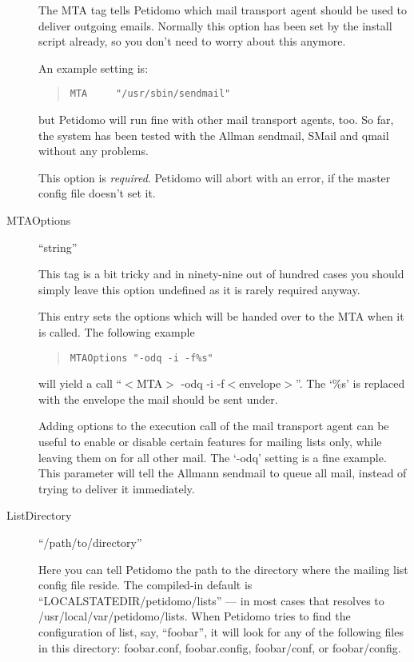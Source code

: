 \documentclass[a4paper,11pt]{scrreprt}
\newcommand{\file}[1]{{\sf #1}}
\begin{document}
\begin{description}
The MTA tag tells Petidomo which mail transport agent should be used
to deliver outgoing emails. Normally this option has been set by the
install script already, so you don't need to worry about this anymore.

An example setting is:
\begin{quote}
\begin{verbatim}
MTA     "/usr/sbin/sendmail"
\end{verbatim}
\end{quote}
but Petidomo will run fine with other mail transport agents, too. So
far, the system has been tested with the Allman sendmail, SMail and
qmail without any problems.

This option is \emph{required}. Petidomo will abort with an error,
if the master config file doesn't set it.


\item[MTAOptions] \hfill ``string''

This tag is a bit tricky and in ninety-nine out of hundred cases you
should simply leave this option undefined as it is rarely required
anyway.

This entry sets the options which will be handed over to the MTA
when it is called. The following example
\begin{quote}
\begin{verbatim}
MTAOptions "-odq -i -f%s"
\end{verbatim}
\end{quote}
will yield a call ``$<$MTA$>$ -odq -i -f$<$envelope$>$''. The `\%s' is
replaced with the envelope the mail should be sent under.

Adding options to the execution call of the mail transport agent can
be useful to enable or disable certain features for mailing lists
only, while leaving them on for all other mail. The `-odq' setting is
a fine example. This parameter will tell the Allmann sendmail to queue
all mail, instead of trying to deliver it immediately.


\item[ListDirectory] \hfill ``/path/to/directory''

Here you can tell Petidomo the path to the directory where the mailing
list config file reside. The compiled-in default is
``LOCALSTATEDIR/petidomo/lists'' --- in most cases that resolves to
\file{/usr/local/var/petidomo/lists}. When Petidomo tries to find the
configuration of list, say, ``foobar'', it will look for any of the
following files in this directory: \file{foobar.conf},
\file{foobar.config}, \file{foobar/conf}, or \file{foobar/config}.


\end{description}
\end{document}
